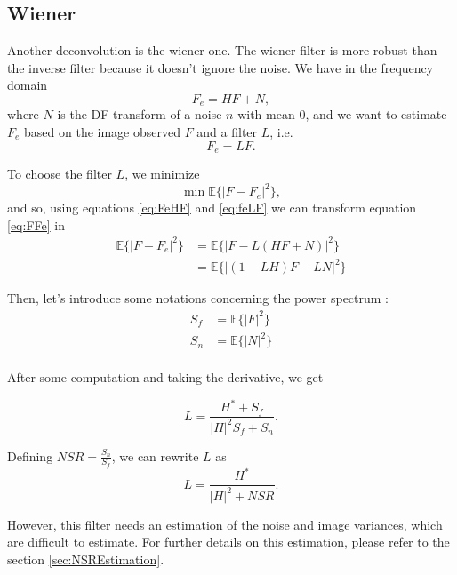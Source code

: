 \subsection{Wiener}
\label{subsec:Wiener}
 Another deconvolution is the wiener one. The wiener filter is more robust than the inverse filter because it doesn't ignore the noise. We have in the frequency domain
\begin{equation}
F_e = HF + N,
\label{eq:FeHF}
\end{equation} 
 where $N$ is the DF transform of a noise $n$ with mean $0$, and we want to estimate $F_e$ based on the image observed $F$ and a filter $L$, i.e. 
 \begin{equation}
 F_e = LF.
 \label{eq:feLF}
 \end{equation}

To choose the filter $L$, we minimize 
\begin{equation}
\min \mathbb{E}\{|F - F_e|^2\},
\label{eq:FFe}
\end{equation}
and so, using equations \eqref{eq:FeHF} and \eqref{eq:feLF} we can transform equation \eqref{eq:FFe} in 
\begin{align}
\mathbb{E}\{|F - F_e|^2\} &= \mathbb{E}\{|F - L(HF+N)|^2\}\\
	&= \mathbb{E}\{|(1-LH)F - LN|^2\}
\end{align}

Then, let's introduce some notations concerning the power spectrum :
\begin{align}
S_f &= \mathbb{E}\{|F|^2\}\\
S_n &= \mathbb{E}\{|N|^2\}\\
\end{align}

After some computation and taking the derivative, we get

\begin{equation}
L = \frac{H^*+S_f}{|H|^2 S_f + S_n}.
\label{eq:LsemiFinal}
\end{equation}

Defining $NSR = \frac{S_n}{S_f}$, we can rewrite $L$ as 
\begin{equation}
L = \frac{H^*}{|H|^2 + NSR}.
\end{equation}

However, this filter needs an estimation of the noise and image variances, which are difficult to estimate. For further details on this estimation, please refer to the section \ref{sec:NSREstimation}.

